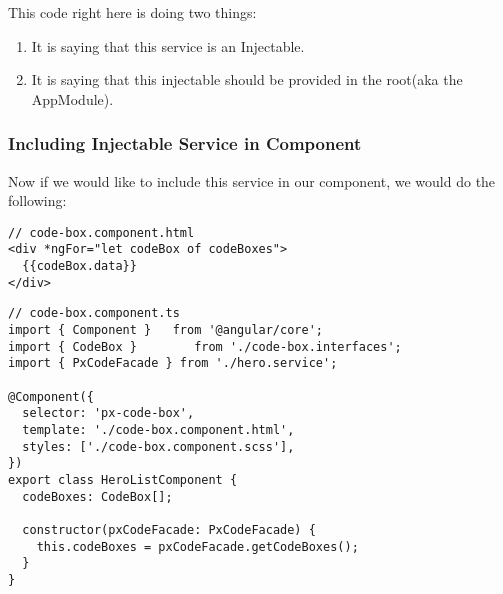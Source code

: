 This code right here is doing two things:
\begin{enumerate}
  \item It is saying that this service is an Injectable.
  \item It is saying that this injectable should be provided in the root(aka the
  AppModule).
\end{enumerate}


\subsubsection{ Including Injectable Service in Component }
Now if we would like to include this service in our component, we would do the
following:
\begin{lstlisting}
// code-box.component.html
<div *ngFor="let codeBox of codeBoxes">
  {{codeBox.data}}
</div>
\end{lstlisting}

\begin{lstlisting}
// code-box.component.ts
import { Component }   from '@angular/core';
import { CodeBox }        from './code-box.interfaces';
import { PxCodeFacade } from './hero.service';

@Component({
  selector: 'px-code-box',
  template: './code-box.component.html',
  styles: ['./code-box.component.scss'],
})
export class HeroListComponent {
  codeBoxes: CodeBox[];

  constructor(pxCodeFacade: PxCodeFacade) {
    this.codeBoxes = pxCodeFacade.getCodeBoxes();
  }
}
\end{lstlisting}


